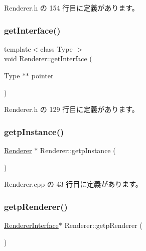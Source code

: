  Renderer.\+h の 154 行目に定義があります。

\mbox{\label{class_renderer_a6e77556825755be3db8a5a734460e66f}} 
\subsubsection{\texorpdfstring{get\+Interface()}{getInterface()}}
{\footnotesize\ttfamily template$<$class Type $>$ \\
void Renderer\+::get\+Interface (\begin{DoxyParamCaption}\item[{Type $\ast$$\ast$}]{pointer }\end{DoxyParamCaption})\hspace{0.3cm}{\ttfamily [inline]}}



 Renderer.\+h の 129 行目に定義があります。

\mbox{\label{class_renderer_a995648604452c47b494de005b30de863}} 
\subsubsection{\texorpdfstring{getp\+Instance()}{getpInstance()}}
{\footnotesize\ttfamily \mbox{\hyperlink{class_renderer}{Renderer}} $\ast$ Renderer\+::getp\+Instance (\begin{DoxyParamCaption}{ }\end{DoxyParamCaption})\hspace{0.3cm}{\ttfamily [static]}}



 Renderer.\+cpp の 43 行目に定義があります。

\mbox{\label{class_renderer_a0d026a0f20ae978c19fd4924b06d26e2}} 
\subsubsection{\texorpdfstring{getp\+Renderer()}{getpRenderer()}}
{\footnotesize\ttfamily \mbox{\hyperlink{class_renderer_interface}{Renderer\+Interface}}$\ast$ Renderer\+::getp\+Renderer (\begin{DoxyParamCaption}{ }\end{DoxyParamCaption})\hspace{0.3cm}{\ttfamily [inline]}}




